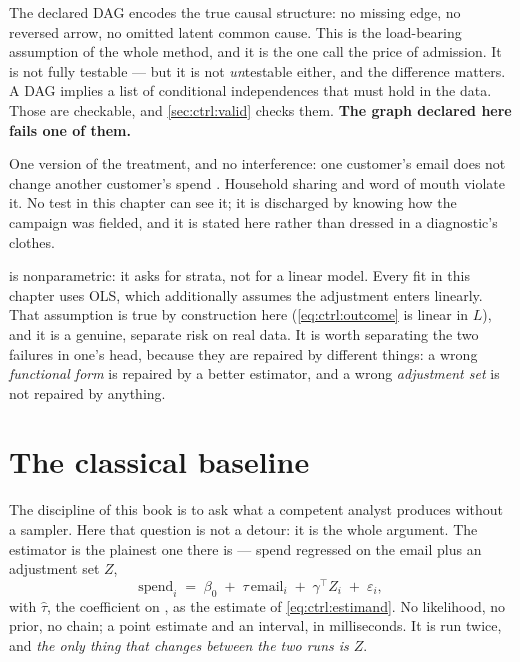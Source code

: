 \begin{assumption}\label{as:ctrl:graph}
The declared DAG encodes the true causal structure: no missing edge, no reversed arrow, no
omitted latent common cause. This is the load-bearing assumption of the whole method, and it is
the one \citet{cinelli2022} call the price of admission. It is not fully testable --- but it is
not \emph{un}testable either, and the difference matters. A DAG implies a list of conditional
independences that must hold in the data. Those are checkable, and \cref{sec:ctrl:valid} checks
them. \textbf{The graph declared here fails one of them.}
\end{assumption}

\begin{assumption}[SUTVA]\label{as:ctrl:sutva}
One version of the treatment, and no interference: one customer's email does not change another
customer's spend \citep{imbens2015}. Household sharing and word of mouth violate it. No test in
this chapter can see it; it is discharged by knowing how the campaign was fielded, and it is
stated here rather than dressed in a diagnostic's clothes.
\end{assumption}

\begin{remark}
 is nonparametric: it asks for strata, not for a linear model. Every fit in
this chapter uses OLS, which additionally assumes the adjustment enters linearly. That
assumption is true by construction here (\cref{eq:ctrl:outcome} is linear in $L$), and it is a
genuine, separate risk on real data. It is worth separating the two failures in one's head,
because they are repaired by different things: a wrong \emph{functional form} is repaired by a
better estimator, and a wrong \emph{adjustment set} is not repaired by anything.
\end{remark}

\section{The classical baseline}
\label{sec:ctrl:classical}

The discipline of this book is to ask what a competent analyst produces without a sampler. Here
that question is not a detour: it is the whole argument. The estimator is the plainest one there
is --- spend regressed on the email plus an adjustment set $Z$,
%
\begin{equation}
  \text{spend}_i \;=\; \beta_0 \;+\; \tau\,\text{email}_i \;+\; \gamma^{\top} Z_i
                      \;+\; \varepsilon_i ,
  \label{eq:ctrl:ols}
\end{equation}
%
with $\hat\tau$, the coefficient on , as the estimate of \cref{eq:ctrl:estimand}. No
likelihood, no prior, no chain; a point estimate and an interval, in milliseconds. It is run
twice, and \emph{the only thing that changes between the two runs is $Z$}.

